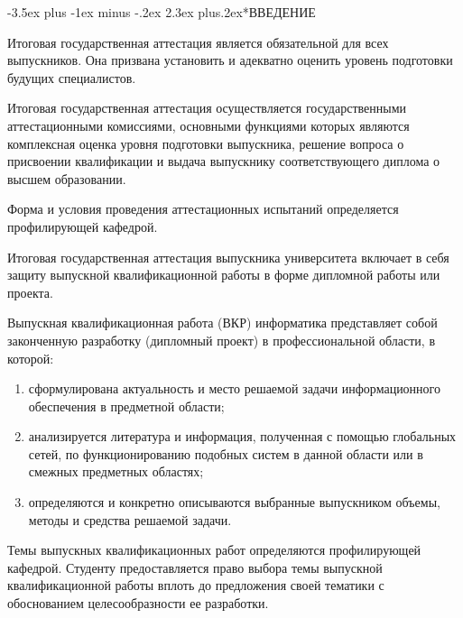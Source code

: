 \documentclass[14pt]{extarticle} %
\makeatletter
\renewcommand{\section}{\@startsection{section}{1}%
{\parindent}{-3.5ex plus -1ex minus -.2ex}%
{2.3ex plus.2ex}{\normalfont\large\bfseries}}
\newcommand{\mynonumbersection}[1]{
\newpage
{
	\centering\section*{#1}
}
\addcontentsline{toc}{section}{#1} 
}
\makeatother
\begin{document}
	

\newpage
\renewcommand{\baselinestretch}{1.5}
\normalsize
\renewcommand{\contentsname}{СОДЕРЖАНИЕ}
\noindent\tableofcontents

\mynonumbersection{ВВЕДЕНИЕ}

Итоговая государственная аттестация является обязательной для всех выпускников. 
Она призвана установить и адекватно оценить уровень подготовки будущих 
специалистов.

Итоговая государственная аттестация осуществляется государственными аттестационными 
комиссиями, основными функциями которых являются комплексная оценка уровня 
подготовки выпускника, решение вопроса о присвоении квалификации и выдача 
выпускнику соответствующего диплома о высшем образовании.

Форма и условия проведения аттестационных испытаний определяется профилирующей кафедрой.

Итоговая государственная аттестация выпускника университета включает в себя
защиту выпускной квалификационной работы в форме дипломной работы или проекта.

\setlength{\itemsep}{0mm}
Выпускная квалификационная работа (ВКР) информатика 
представляет собой законченную разработку (дипломный проект) в профессиональной области, 
в которой: 

\begin{enumerate}[label=\arabic*)]  
\item сформулирована актуальность и место решаемой задачи 
информационного обеспечения в предметной области;
\item анализируется литература и информация, полученная с помощью 
глобальных сетей, по функционированию подобных систем в данной области 
или в смежных \linebreak[4] предметных областях; 
\item определяются и конкретно описываются выбранные выпускником объемы, 
методы и средства решаемой задачи.
\end{enumerate}

Темы выпускных квалификационных работ определяются профилирующей кафедрой. 
Студенту предоставляется право выбора темы выпускной квалификационной работы 
вплоть до предложения своей тематики с обоснованием целесообразности ее разработки.
\end{document}
